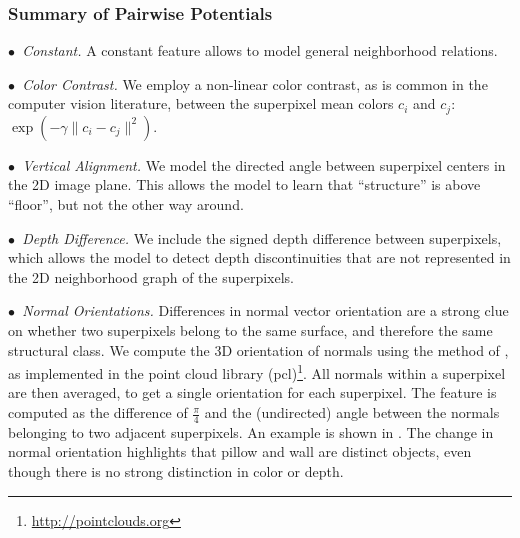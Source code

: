 \documentclass[final,ignorenonframetext,compress]{beamer}
\begin{document}
    \begin{frame}
        \frametitle{Summary of Pairwise Potentials}
            \noindent\emph{$\bullet$~Constant.}
                A constant feature allows to model general neighborhood relations.


            \noindent\emph{$\bullet$~Color Contrast.}
                We employ a non-linear color contrast, as is common in the computer
                vision literature, between the superpixel mean colors $c_i$ and $c_j$:
                $\exp\left(-\gamma \lVert c_i - c_j \rVert^2\right)$.


            \noindent\emph{$\bullet$~Vertical Alignment.}
                We model the directed angle between superpixel centers in the 2D image
                plane.  This allows the  model to learn that ``structure'' is above
                ``floor'', but not the other way around.


            \noindent\emph{$\bullet$~Depth Difference.}
                We include the signed depth difference between superpixels, which
                allows the model to detect depth discontinuities that are not
                represented in the 2D neighborhood graph of the superpixels.


            \noindent\emph{$\bullet$~Normal Orientations.}
                Differences in normal vector orientation are a strong clue on
                whether two superpixels belong to the same surface, and therefore the
                same structural class.
                We compute the 3D orientation of normals using the method of \citet{holz_2011_robocup},
                as implemented in the point cloud library (pcl)\footnote{\url{http://pointclouds.org}}.
                All normals within a superpixel are then averaged, to get a single orientation for each superpixel.
                The feature is computed as the difference of $\frac{\pi}{4}$ and the (undirected) angle between the normals belonging
                to two adjacent superpixels.  
                An example is shown in . The change
                in normal orientation highlights that pillow and wall are distinct
                objects, even though there is no strong distinction in color or depth.
    \end{frame}

\end{document}
